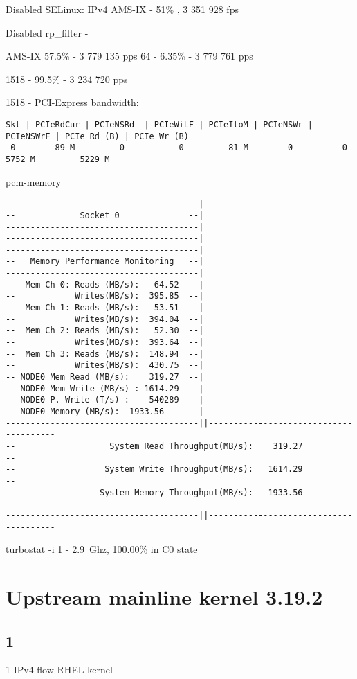 Disabled SELinux:
IPv4 AMS-IX - 51\% , 3 351 928 fps

Disabled rp\_filter -

AMS-IX 57.5\% - 3 779 135 pps
64 - 6.35\% - 3 779 761 pps

1518 - 99.5\% - 3 234 720 pps

1518 - PCI-Express bandwidth:
\begin{lstlisting}
Skt | PCIeRdCur | PCIeNSRd  | PCIeWiLF | PCIeItoM | PCIeNSWr | PCIeNSWrF | PCIe Rd (B) | PCIe Wr (B)
 0        89 M         0           0         81 M        0          0          5752 M         5229 M
\end{lstlisting}

pcm-memory
\begin{lstlisting}
---------------------------------------|
--             Socket 0              --|
---------------------------------------|
---------------------------------------|
---------------------------------------|
--   Memory Performance Monitoring   --|
---------------------------------------|
--  Mem Ch 0: Reads (MB/s):   64.52  --|
--            Writes(MB/s):  395.85  --|
--  Mem Ch 1: Reads (MB/s):   53.51  --|
--            Writes(MB/s):  394.04  --|
--  Mem Ch 2: Reads (MB/s):   52.30  --|
--            Writes(MB/s):  393.64  --|
--  Mem Ch 3: Reads (MB/s):  148.94  --|
--            Writes(MB/s):  430.75  --|
-- NODE0 Mem Read (MB/s):    319.27  --|
-- NODE0 Mem Write (MB/s) : 1614.29  --|
-- NODE0 P. Write (T/s) :    540289  --|
-- NODE0 Memory (MB/s):  1933.56     --|
---------------------------------------||---------------------------------------
--                   System Read Throughput(MB/s):    319.27                  --
--                  System Write Throughput(MB/s):   1614.29                  --
--                 System Memory Throughput(MB/s):   1933.56                  --
---------------------------------------||---------------------------------------
\end{lstlisting}
turbostat -i 1 - 2.9~Ghz, 100.00\% in C0 state



\section{Upstream mainline kernel 3.19.2}

\subsection{1}
1 IPv4 flow RHEL kernel

